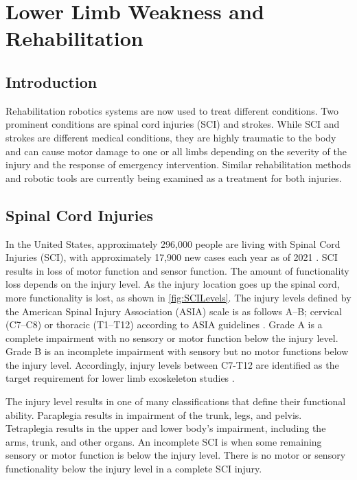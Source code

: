 \section{Lower Limb Weakness and Rehabilitation}
\subsection{Introduction}
Rehabilitation robotics systems are now used to treat different conditions. 
Two prominent conditions are spinal cord injuries (SCI) and strokes. While SCI and strokes are different medical conditions, they are highly traumatic to the body and can cause motor damage to one or all limbs depending on the severity of the injury and the response of emergency intervention. Similar rehabilitation methods and robotic tools are currently being examined as a treatment for both injuries.  


\subsection{Spinal Cord Injuries}
In the United States, approximately 296,000 people are living with Spinal Cord Injuries (SCI), with approximately 17,900 new cases each year as of 2021 \cite{national2021facts}. SCI results in loss of motor function and sensor function. The amount of functionality loss depends on the injury level. As the injury location goes up the spinal cord, more functionality is lost, as shown in \autoref{fig:SCILevels}. The injury levels defined by the  American Spinal Injury Association (ASIA)  scale is as follows A–B; cervical (C7–C8) or thoracic (T1–T12) according to ASIA guidelines \cite{kirshblum2011international}. Grade A is a complete impairment with no sensory or motor function below the injury level. Grade B is an incomplete impairment with sensory but no motor functions below the injury level. Accordingly, injury levels between C7-T12 are identified as the target requirement for lower limb exoskeleton studies \cite{esquenazi2012rewalk}. 

The injury level results in one of many classifications that define their functional ability. Paraplegia results in impairment of the trunk, legs, and pelvis. Tetraplegia results in the upper and lower body's impairment, including the arms, trunk, and other organs. An incomplete SCI is when some remaining sensory or motor function is below the injury level. There is no motor or sensory functionality below the injury level in a complete SCI injury. 

